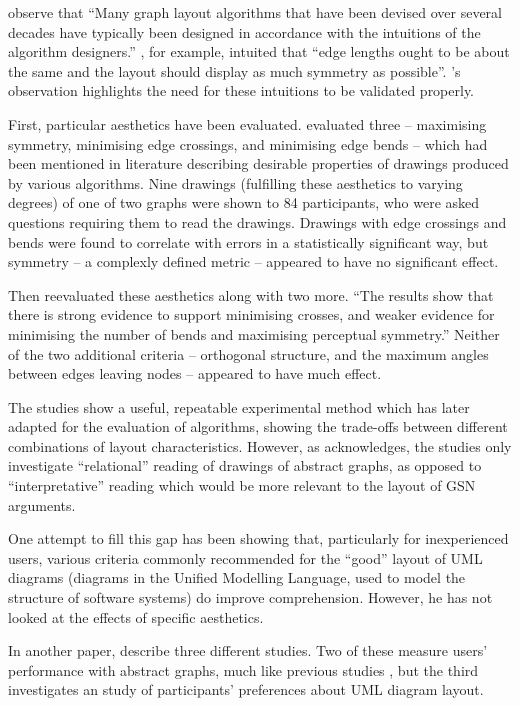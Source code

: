 \citet{5674033} observe that ``Many graph layout algorithms that have been devised over
several decades have typically been designed in accordance with the intuitions of the algorithm designers.''
\citet{eades84}, for example, intuited that ``edge lengths ought to be about the same and the layout should display as much symmetry as possible''.
\citeauthor{5674033}'s observation highlights the need for these intuitions to be validated properly.

First, particular aesthetics have been evaluated. \citet{Purchase1997basis} evaluated three -- maximising symmetry, minimising edge crossings, and minimising edge bends -- which had been mentioned in literature describing desirable properties of drawings produced by various algorithms. 
Nine drawings (fulfilling these aesthetics to varying degrees) of one of two graphs were shown to 84 participants,
who were asked questions requiring them to read the drawings.
Drawings with edge crossings and bends were found to correlate with errors in a statistically significant way, but symmetry -- a complexly defined metric -- appeared to have no significant effect.

Then \citet{Purchase1997which} reevaluated these aesthetics along with two more. ``The results show that there is strong
evidence to support minimising crosses, and weaker evidence for minimising the number of bends and maximising perceptual symmetry.''
Neither of the two additional criteria -- orthogonal structure, and the maximum angles between edges leaving nodes -- appeared to have much effect.

The studies show a useful, repeatable experimental method which \citet{PURCHASE1998647} has later adapted for the evaluation of algorithms, showing the trade-offs between different combinations of layout characteristics.
However, as \citet{Purchase1997which} acknowledges, the studies only investigate ``relational'' reading of drawings of abstract graphs, as opposed to ``interpretative'' reading which would be more relevant to the layout of GSN arguments.

One attempt to fill this gap has been \citet{storrle} showing that, particularly for inexperienced users, various criteria commonly recommended for the ``good'' layout of UML diagrams (diagrams in the Unified Modelling Language, used to model the structure of software systems) do improve comprehension. However, he has not looked at the effects of specific aesthetics.

In another paper, \citet{Purchase:2002:EEA:594512.594527} describe three different studies. Two of these measure users' performance with abstract graphs, much like previous studies \cite{Purchase1997basis, Purchase1997which, PURCHASE1998647}, but the third investigates an study of participants' preferences about UML diagram layout.

